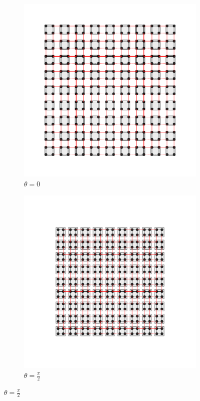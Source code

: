 \begin{figure}[h!]
\begin{minipage}[h!]{1\textwidth}
\begin{subfigure}[b!]{0.2 \textwidth}
         \end{subfigure}\hspace*{-0.5em}
         \begin{subfigure}[b!]{0.2 \textwidth}
             \caption*{$\theta = 0$}
             \includegraphics[width=\textwidth]{Imagenes/Models/Model_pump/square_pump_model_xy_8.pdf}
         \end{subfigure}\hspace*{-0.5em}
         \begin{subfigure}[b!]{0.2 \textwidth}
             \caption*{$\theta = \frac{\pi}{2}$}
             \includegraphics[width=\textwidth]{Imagenes/Models/Model_pump/square_pump_model_xy_11.pdf}

\end{subfigure}
\end{minipage}
\end{figure}
